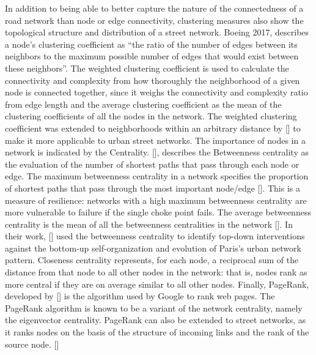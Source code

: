 In addition to being able to better capture the nature of the connectedness of a road network than node or edge connectivity, clustering measures also show the topological structure and distribution of a street network. Boeing 2017, describes a node’s clustering coefficient as “the ratio of the number of edges between its neighbors to the maximum possible number of edges that would exist between these neighbors”. The weighted clustering coefficient is used to calculate the connectivity and complexity from how thoroughly the neighborhood of a given node is connected together, since it weighs the connectivity and complexity ratio from edge length and the average clustering coefficient as the mean of the clustering coefficients of all the nodes in the network. The weighted clustering coefficient was extended to neighborhoods within an arbitrary distance by [\cite{Jiang:2004}] to make it more applicable to urban street networks. The importance of nodes in a network is indicated by the Centrality. [\cite{Barthelemy:2004}], describes the Betweenness centrality as the evaluation of the number of shortest paths that pass through each node or edge. The maximum betweenness centrality in a network specifies the  proportion of shortest paths that pass through the most important node/edge [\cite{Boeing:2017}]. This is a measure of resilience: networks with a high maximum betweenness centrality are more vulnerable to failure if the single choke point fails. The average betweenness centrality is the mean of all the betweenness centralities in the network [\cite{Barthelemy:2011}]. In their work, [\cite{Barthelemy:2013}] used the betweenness centrality to identify top-down interventions against the bottom-up self-organization and evolution of Paris's urban network pattern. Closeness centrality represents, for each node, a reciprocal sum of the distance from that node to all other nodes in the network: that is, nodes rank as more central if they are on average similar to all other nodes. Finally, PageRank, developed by [\cite{Brin:1998}] is the algorithm used by Google to rank web pages. The PageRank algorithm is known to be a variant of the network centrality, namely the eigenvector centrality. PageRank can also be extended to street networks, as it ranks nodes on the basis of the structure of incoming links and the rank of the source node. [\cite{Agryzkov:2012, Chin:2015}]

